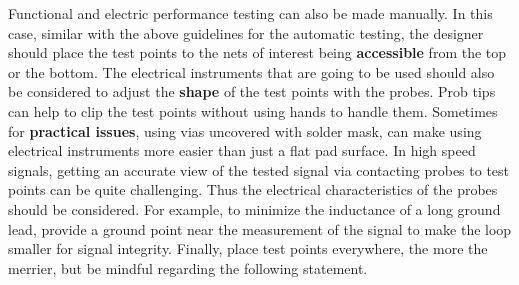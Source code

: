 \documentclass[final]{cubedoc}
\begin{document}
	Functional and electric performance testing can also be made manually. In this case, similar with the above guidelines for the automatic testing, the designer should place the test points to the nets of interest being \textbf{accessible} from the top or the bottom. The electrical instruments that are going to be used should also be considered to adjust the \textbf{shape} of the test points with the probes. Prob tips can help to clip the test points without using hands to handle them. Sometimes for \textbf{practical issues}, using vias uncovered with solder mask, can make using electrical instruments more easier than just a flat pad surface. In high speed signals, getting an accurate view of the tested signal via contacting probes to test points can be quite challenging. Thus the electrical characteristics of the probes should be considered. For example, to minimize the inductance of a long ground lead, provide a ground point near the measurement of the signal to make the loop smaller for signal integrity. Finally, place test points everywhere, the more the merrier, but be mindful regarding the following statement. 
	
	
	
	
	
	
	
	
\end{document}
